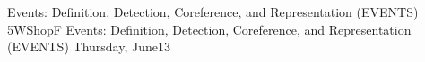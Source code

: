 \begin{wsschedule}
{Events: Definition, Detection, Coreference, and Representation (EVENTS)}
{5}{WShopF}
{Events: Definition, Detection, Coreference, and Representation (EVENTS)}
{Thursday, June13}{\WShopLocF}

\end{wsschedule}
